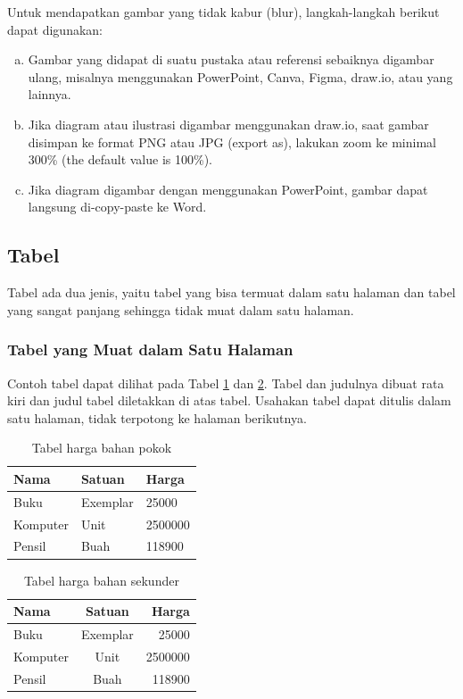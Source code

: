 \documentclass[12pt,a4paper,oneside]{book}
\begin{document}
Untuk mendapatkan gambar yang tidak kabur (blur), langkah-langkah berikut dapat digunakan:
\begin{enumerate}[(a)]
\item Gambar yang didapat di suatu pustaka atau referensi sebaiknya digambar ulang, misalnya menggunakan PowerPoint, Canva, Figma, draw.io, atau yang lainnya.
\item Jika diagram atau ilustrasi digambar menggunakan draw.io, saat gambar disimpan ke format PNG atau JPG (export as), lakukan zoom ke minimal 300\% (the default value is 100\%). 
\item Jika diagram digambar dengan menggunakan PowerPoint, gambar dapat langsung di-copy-paste ke Word.
\end{enumerate}

\subsection{Tabel}
Tabel ada dua jenis, yaitu tabel yang bisa termuat dalam satu halaman dan tabel yang sangat panjang sehingga tidak muat dalam satu halaman.
\subsubsection{Tabel yang Muat dalam Satu Halaman}
Contoh tabel dapat dilihat pada Tabel \ref{tbl:harga1} dan \ref{tbl:harga2}. Tabel dan judulnya dibuat rata kiri dan judul tabel diletakkan di atas tabel. Usahakan tabel dapat ditulis dalam satu halaman, tidak terpotong ke halaman berikutnya.

\begin{table}[t] %
  \begin{tabular}{ | p{2cm} | p{2cm} | p{3cm} |}
	\hline
	Nama 	& Satuan 		& Harga \\
	\hline
	Buku 	& Exemplar	& 25000 \\
	Komputer	& Unit		& 2500000 \\
	Pensil	& Buah		& 118900 \\
	\hline
	\end{tabular}
\caption{Tabel harga bahan pokok}
\label{tbl:harga1}
\end{table}

\begin{table}[t] %
	\begin{tabular}{ | l | c | r | }
	\hline
	Nama 	& Satuan 		& Harga \\
	\hline
	Buku 	& Exemplar	& 25000 \\
	Komputer	& Unit		& 2500000 \\
	Pensil	& Buah		& 118900 \\
	\hline
	\end{tabular}
\caption{Tabel harga bahan sekunder}
\label{tbl:harga2}
\end{table}
\end{document}

